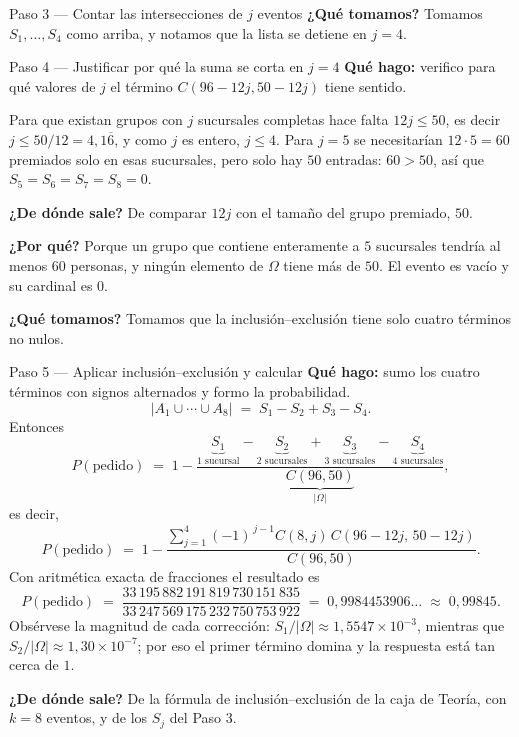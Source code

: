 \documentclass[11pt]{article}
\begin{document}
\begin{sol}
\begin{paso}{Paso 3 --- Contar las intersecciones de $j$ eventos}
\textbf{¿Qu\'e tomamos?} Tomamos $S_1,\dots,S_4$ como arriba, y notamos que la lista se detiene en $j=4$.
\end{paso}

\begin{paso}{Paso 4 --- Justificar por qu\'e la suma se corta en $j=4$}
\textbf{Qu\'e hago:} verifico para qu\'e valores de $j$ el t\'ermino $C(96-12j,50-12j)$ tiene sentido.

Para que existan grupos con $j$ sucursales completas hace falta $12j\le 50$, es decir $j\le 50/12=4{,}1\overline{6}$, y como $j$ es entero, $j\le 4$. Para $j=5$ se necesitar\'ian $12\cdot 5=60$ premiados solo en esas sucursales, pero solo hay $50$ entradas: $60>50$, as\'i que $S_5=S_6=S_7=S_8=0$.

\textbf{¿De d\'onde sale?} De comparar $12j$ con el tama\~no del grupo premiado, $50$.

\textbf{¿Por qu\'e?} Porque un grupo que contiene enteramente a $5$ sucursales tendr\'ia al menos $60$ personas, y ning\'un elemento de $\Omega$ tiene m\'as de $50$. El evento es vac\'io y su cardinal es $0$.

\textbf{¿Qu\'e tomamos?} Tomamos que la inclusi\'on--exclusi\'on tiene solo cuatro t\'erminos no nulos.
\end{paso}

\begin{paso}{Paso 5 --- Aplicar inclusi\'on--exclusi\'on y calcular}
\textbf{Qu\'e hago:} sumo los cuatro t\'erminos con signos alternados y formo la probabilidad.
\[
|A_1\cup\cdots\cup A_8| \;=\; S_1-S_2+S_3-S_4 .
\]
Entonces
\[
P(\text{pedido})\;=\;1-\frac{\underbrace{S_1}_{\text{1 sucursal}}-\underbrace{S_2}_{\text{2 sucursales}}+\underbrace{S_3}_{\text{3 sucursales}}-\underbrace{S_4}_{\text{4 sucursales}}}{\underbrace{C(96,50)}_{|\Omega|}} ,
\]
es decir,
\[
P(\text{pedido})\;=\;1-\frac{\displaystyle\sum_{j=1}^{4}(-1)^{\,j-1}C(8,j)\,C(96-12j,\,50-12j)}{C(96,50)} .
\]
Con aritm\'etica exacta de fracciones el resultado es
\[
P(\text{pedido}) \;=\; \frac{33\,195\,882\,191\,819\,730\,151\,835}{33\,247\,569\,175\,232\,750\,753\,922}\;=\;0{,}9984453906\ldots\;\approx\;0{,}99845 .
\]
Obs\'ervese la magnitud de cada correcci\'on: $S_1/|\Omega|\approx 1{,}5547\times 10^{-3}$, mientras que $S_2/|\Omega|\approx 1{,}30\times 10^{-7}$; por eso el primer t\'ermino domina y la respuesta est\'a tan cerca de $1$.

\textbf{¿De d\'onde sale?} De la f\'ormula de inclusi\'on--exclusi\'on de la caja de Teor\'ia, con $k=8$ eventos, y de los $S_j$ del Paso 3.


\end{paso}
\end{sol}
\end{document}
